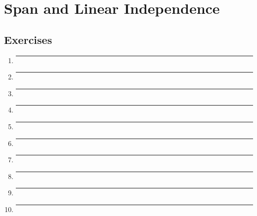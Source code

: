 \section{Span and Linear Independence}
\subsection{Exercises}


\begin{enumerate}[label=\textbf{\arabic*}]

  \item{
    \label{ssec: Ex2A-1}
    \lipsum[66]
    \bigbreak
    \hrule
    \bigbreak
  }

  \item{
    \lipsum[75]
    \bigbreak
    \hrule
    \bigbreak
  }

  \item{
    \lipsum[74]
    \bigbreak
    \hrule
    \bigbreak
  }

  \item{
    \lipsum[28]
    \bigbreak
    \hrule
    \bigbreak
  }

  \item{
    \lipsum[32]
    \bigbreak
    \hrule
    \bigbreak
  }

  \item{
    \lipsum[27]
    \bigbreak
    \hrule
    \bigbreak
  }

  \item{
    \lipsum[4]
    \bigbreak
    \hrule
    \bigbreak
  }

  \item{
    \lipsum[17]
    \bigbreak
    \hrule
    \bigbreak
  }

  \item{
    \lipsum[6]
    \bigbreak
    \hrule
    \bigbreak
  }

  \item{
    \lipsum[43]
    \bigbreak
    \hrule
    \bigbreak
  }


\end{enumerate}
